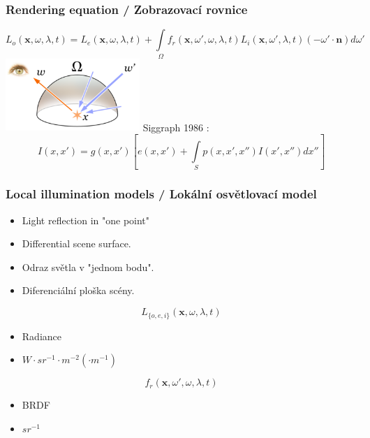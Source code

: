 \begin{frame}
    \frametitle{Rendering equation / Zobrazovací rovnice}
    \begin{equation*}
        L_o(\mathbf x, \omega, \lambda, t) = L_e(\mathbf x, \omega, \lambda, t) + \int\limits_\Omega f_r(\mathbf x, \omega', \omega, \lambda, t) L_i(\mathbf x, \omega', \lambda, t) (-\omega' \cdot \mathbf n) d \omega'
    \end{equation*}
    \includegraphics[width=2in]{pics/physicallyBasedRendering/rendering}
    \vfill
    Siggraph 1986 :
    \begin{equation*}
        \displaystyle I(x, x') = g(x, x')\left[ e(x, x') + \int\limits_S p(x, x', x'')I(x', x'')dx''\right]
    \end{equation*}
\end{frame}

\begin{frame}\frametitle{Local illumination models / Lokální osvětlovací model}
  \scriptsize
  \begin{itemize}
      \item Light reflection in "one point"
      \item Differential scene surface.
  \end{itemize}
  \begin{itemize}
      \item Odraz světla v "jednom bodu".
      \item Diferenciální ploška scény.
  \end{itemize}
  \pause\vfill
  \begin{equation*}
      L_{\{o,e,i\}}(\mathbf x, \omega, \lambda, t)
  \end{equation*}
  \begin{itemize}
       \item Radiance
       \item $W \cdot sr^{-1} \cdot m^{-2} (\cdot m^{-1})$
  \end{itemize}
  \pause\vfill
  \begin{equation*}
      f_r(\mathbf x, \omega', \omega, \lambda, t)
  \end{equation*}
  \begin{itemize}
      \item BRDF
      \item $sr^{-1}$
  \end{itemize}
\end{frame}

